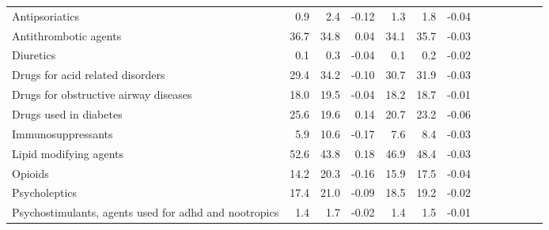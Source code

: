 \documentclass[11pt,]{article}
\begin{document}
\begin{longtable}{lrrrrrrrrrrrr}
      Antipsoriatics &  0.9 &  2.4 & -0.12 &  1.3 &  1.8 & -0.04 \\ 
      Antithrombotic agents & 36.7 & 34.8 &  0.04 & 34.1 & 35.7 & -0.03 \\ 
      Diuretics &  0.1 &  0.3 & -0.04 &  0.1 &  0.2 & -0.02 \\ 
      Drugs for acid related disorders & 29.4 & 34.2 & -0.10 & 30.7 & 31.9 & -0.03 \\ 
      Drugs for obstructive airway diseases & 18.0 & 19.5 & -0.04 & 18.2 & 18.7 & -0.01 \\ 
      Drugs used in diabetes & 25.6 & 19.6 &  0.14 & 20.7 & 23.2 & -0.06 \\ 
      Immunosuppressants &  5.9 & 10.6 & -0.17 &  7.6 &  8.4 & -0.03 \\ 
      Lipid modifying agents & 52.6 & 43.8 &  0.18 & 46.9 & 48.4 & -0.03 \\ 
      Opioids & 14.2 & 20.3 & -0.16 & 15.9 & 17.5 & -0.04 \\ 
      Psycholeptics & 17.4 & 21.0 & -0.09 & 18.5 & 19.2 & -0.02 \\ 
      Psychostimulants, agents used for adhd and nootropics &  1.4 &  1.7 & -0.02 &  1.4 &  1.5 & -0.01 \\ 
   \bottomrule\end{longtable}
\clearpage
{}
\end{document}

